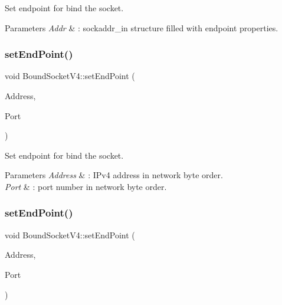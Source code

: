 Set endpoint for bind the socket. 
\begin{DoxyParams}{Parameters}
{\em Addr} & \+: sockaddr\+\_\+in structure filled with endpoint properties. \\
\hline
\end{DoxyParams}
\mbox{\label{classBoundSocketV4_a908a6e916879fc18585fef69d0518171}} 
\subsubsection{\texorpdfstring{set\+End\+Point()}{setEndPoint()}\hspace{0.1cm}{\footnotesize\ttfamily [2/3]}}
{\footnotesize\ttfamily void Bound\+Socket\+V4\+::set\+End\+Point (\begin{DoxyParamCaption}\item[{in\+\_\+addr\+\_\+t}]{Address,  }\item[{short}]{Port }\end{DoxyParamCaption})\hspace{0.3cm}{\ttfamily [virtual]}}

Set endpoint for bind the socket. 
\begin{DoxyParams}{Parameters}
{\em Address} & \+: I\+Pv4 address in network byte order. \\
\hline
{\em Port} & \+: port number in network byte order. \\
\hline
\end{DoxyParams}
\mbox{\label{classBoundSocketV4_a5d3bb922ff5727df01e20782b546714e}} 
\subsubsection{\texorpdfstring{set\+End\+Point()}{setEndPoint()}\hspace{0.1cm}{\footnotesize\ttfamily [3/3]}}
{\footnotesize\ttfamily void Bound\+Socket\+V4\+::set\+End\+Point (\begin{DoxyParamCaption}\item[{const char $\ast$}]{Address,  }\item[{short}]{Port }\end{DoxyParamCaption})\hspace{0.3cm}{\ttfamily [virtual]}}

